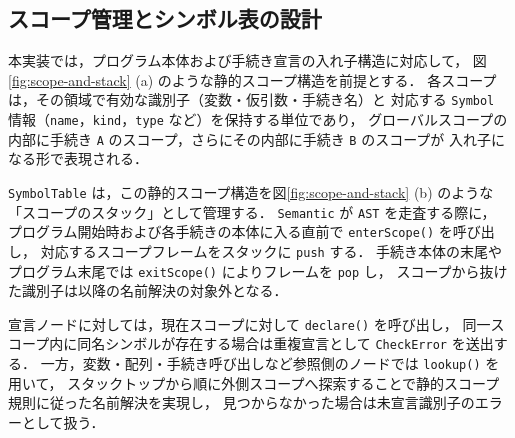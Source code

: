 \documentclass[a4j,10pt]{jarticle}
\begin{document}
\subsection{スコープ管理とシンボル表の設計}

本実装では，プログラム本体および手続き宣言の入れ子構造に対応して，
図\ref{fig:scope-and-stack} (a) のような静的スコープ構造を前提とする．
各スコープは，その領域で有効な識別子（変数・仮引数・手続き名）と
対応する \verb|Symbol| 情報（\verb|name|，\verb|kind|，\verb|type| など）を保持する単位であり，
グローバルスコープの内部に手続き \verb|A| のスコープ，さらにその内部に手続き \verb|B| のスコープが
入れ子になる形で表現される．

\verb|SymbolTable| は，この静的スコープ構造を図\ref{fig:scope-and-stack} (b) のような
「スコープのスタック」として管理する．
\verb|Semantic| が \verb|AST| を走査する際に，
プログラム開始時および各手続きの本体に入る直前で \verb|enterScope()| を呼び出し，
対応するスコープフレームをスタックに \verb|push| する．
手続き本体の末尾やプログラム末尾では \verb|exitScope()| によりフレームを \verb|pop| し，
スコープから抜けた識別子は以降の名前解決の対象外となる．

宣言ノードに対しては，現在スコープに対して \verb|declare()| を呼び出し，
同一スコープ内に同名シンボルが存在する場合は重複宣言として \verb|CheckError| を送出する．
一方，変数・配列・手続き呼び出しなど参照側のノードでは \verb|lookup()| を用いて，
スタックトップから順に外側スコープへ探索することで静的スコープ規則に従った名前解決を実現し，
見つからなかった場合は未宣言識別子のエラーとして扱う．
\end{document}
